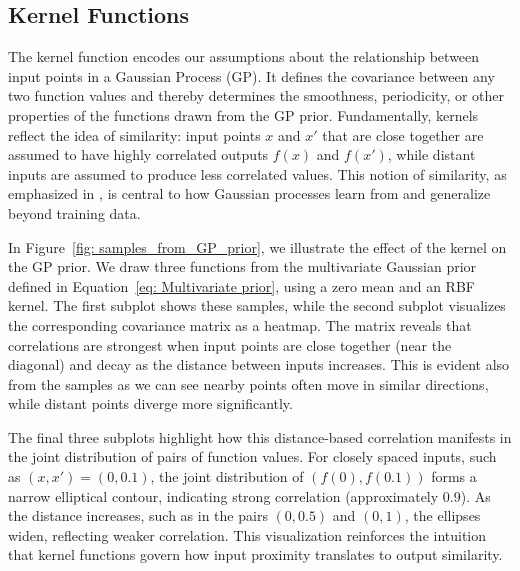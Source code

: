 \documentclass[12pt]{article}
\begin{document}
\subsection{Kernel Functions}
\label{sec: Kernels}
The kernel function encodes our assumptions about the relationship between input points in a Gaussian Process (GP).
It defines the covariance between any two function values and thereby determines the smoothness, periodicity, or other properties of the functions drawn from the GP prior.
Fundamentally, kernels reflect the idea of similarity: input points \( x \) and \( x' \) that are close together are assumed to have highly correlated outputs \( f(x) \) and \( f(x') \),
while distant inputs are assumed to produce less correlated values. This notion of similarity, as emphasized in \cite[p.~79]{bible}, is central to how Gaussian processes learn from and generalize beyond training data.

\vspace{1em}
\noindent
In Figure~\ref{fig: samples_from_GP_prior}, we illustrate the effect of the kernel on the GP prior.
We draw three functions from the multivariate Gaussian prior defined in Equation~\ref{eq: Multivariate prior}, using a zero mean and an RBF kernel.
The first subplot shows these samples, while the second subplot visualizes the corresponding covariance matrix as a heatmap.
The matrix reveals that correlations are strongest when input points are close together (near the diagonal) and decay as the distance between inputs increases.
This is evident also from the samples as we can see nearby points often move in similar directions, while distant points diverge more significantly.

\vspace{1em}
\noindent
The final three subplots highlight how this distance-based correlation manifests in the joint distribution of pairs of function values.
For closely spaced inputs, such as \( (x, x') = (0, 0.1) \), the joint distribution of \( (f(0), f(0.1)) \) forms a narrow elliptical contour,
indicating strong correlation (approximately 0.9). As the distance increases, such as in the pairs \( (0, 0.5) \) and \( (0, 1) \), the ellipses widen, reflecting weaker correlation. This visualization reinforces the intuition that kernel functions govern how input proximity translates to output similarity.
\end{document}
